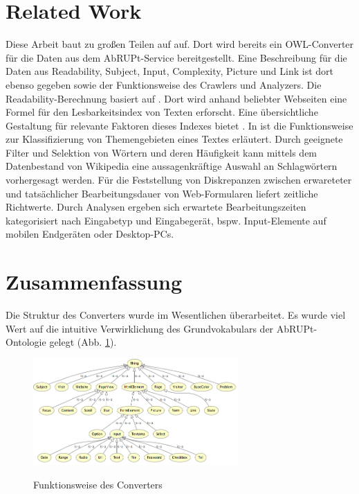 \documentclass[runningheads,a4paper]{llncs}
\begin{document}


\section{Related Work}
\label{sec:related_work}

Diese Arbeit baut zu großen Teilen auf \cite{Brieger} auf. 
Dort wird bereits ein OWL-Converter für die Daten aus dem AbRUPt-Service bereitgestellt.
Eine Beschreibung für die Daten aus Readability, Subject, Input, Complexity, Picture und Link ist dort ebenso gegeben sowie der Funktionsweise des Crawlers und Analyzers.
Die Readability-Berechnung basiert auf \cite{readability}. 
Dort wird anhand beliebter Webseiten eine Formel für den Lesbarkeitsindex von Texten erforscht.
Eine übersichtliche Gestaltung für relevante Faktoren dieses Indexes bietet \cite{lesbarkeit}.
In \cite{subject} ist die Funktionsweise zur Klassifizierung von Themengebieten eines Textes erläutert.
Durch geeignete Filter und Selektion von Wörtern und deren Häufigkeit kann mittels dem Datenbestand von Wikipedia eine aussagenkräftige Auswahl an Schlagwörtern vorhergesagt werden.
Für die Feststellung von Diskrepanzen zwischen erwareteter und tatsächlicher Bearbeitungsdauer von Web-Formularen liefert \cite{web_forms} zeitliche Richtwerte.
Durch Analysen ergeben sich erwartete Bearbeitungszeiten kategorisiert nach Eingabetyp und Eingabegerät, bspw. Input-Elemente auf mobilen Endgeräten oder Desktop-PCs.


\section{Zusammenfassung}
\label{sec:conclusion}

Die Struktur des Converters wurde im Wesentlichen überarbeitet.
Es wurde viel Wert auf die intuitive Verwirklichung des Grundvokabulars der AbRUPt-Ontologie gelegt (Abb. \ref{fig:onto}).

\begin{figure}
\caption{Funktionsweise des Converters}
\centering
\includegraphics[width=0.7\textwidth]{figures/tbox}
\label{fig:onto}
\end{figure}
\end{document}

